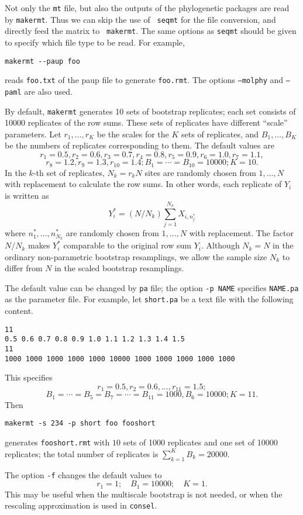 \documentclass[12pt]{article}
\begin{document}
Not only the {\tt mt} file, but also the outputs of the phylogenetic
packages are read by {\tt makermt}. Thus we can skip the use of {\tt
seqmt} for the file conversion, and directly feed the matrix to {\tt
makermt}.  The same options as {\tt seqmt} should be given to specify
which file type to be read. For example,
\begin{verbatim}
makermt --paup foo
\end{verbatim}
reads {\tt foo.txt} of the paup file to generate {\tt foo.rmt}. The
options {\tt --molphy} and {\tt --paml} are also used.

By default, {\tt makermt} generates 10 sets of bootstrap replicates;
each set consists of 10000 replicates of the row sums.  These sets of
replicates have different ``scale'' parameters.  Let $r_1,\ldots,r_K$ be
the scales for the $K$ sets of replicates, and $B_1,\ldots,B_K$ be the
numbers of replicates corresponding to them. The default values are \[
r_1=0.5, r_2=0.6, r_3=0.7, r_4=0.8, r_5=0.9, r_6=1.0, r_7=1.1, \] \[
r_8=1.2, r_9=1.3, r_{10}=1.4; B_1 = \cdots = B_{10} = 10000; K=10.  \]
In the $k$-th set of replicates, $N_k=r_k N$ sites are randomly chosen
from $1,\ldots,N$ with replacement to calculate the row sums. In other
words, each replicate of $Y_i$ is written as \[ Y^*_{i} = (N/N_k)
\sum_{j=1}^{N_k} X_{i,n^*_j} \] where $n^*_1,\ldots,n^*_{N_k}$ are
randomly chosen from $1,\ldots,N$ with replacement. The factor $N/N_k$
makes $Y^*_i$ comparable to the original row sum $Y_i$. Although $N_k=N$
in the ordinary non-parametric bootstrap resamplings, we allow the
sample size $N_k$ to differ from $N$ in the scaled bootstrap
resamplings.

The default value can be changed by {\tt pa} file; the option {\tt -p
NAME} specifies {\tt NAME.pa} as the parameter file.  For example, let
{\tt short.pa} be a text file with the following content.
\begin{verbatim}
11
0.5 0.6 0.7 0.8 0.9 1.0 1.1 1.2 1.3 1.4 1.5
11
1000 1000 1000 1000 1000 10000 1000 1000 1000 1000 1000
\end{verbatim}
This specifies
\[
 r_1=0.5, r_2=0.6,\ldots,r_{11}=1.5;
\]
\[
B_1=\cdots=B_5=B_7=\cdots=B_{11}=1000, B_6=10000; K=11.
\]
Then
\begin{verbatim}
makermt -s 234 -p short foo fooshort
\end{verbatim}
generates {\tt fooshort.rmt} with $10$ sets of 1000 replicates and one
set of 10000 replicates; the total number of replicates is $\sum_{k=1}^K
B_k= 20000$. 

The option {\tt -f} changes the default values to
\[
 r_1 = 1;\quad B_1=10000;\quad K=1.
\]
This may be useful when the multiscale bootstrap is not needed, or when
the rescaling approximation is used in {\tt consel}.
\end{document}
